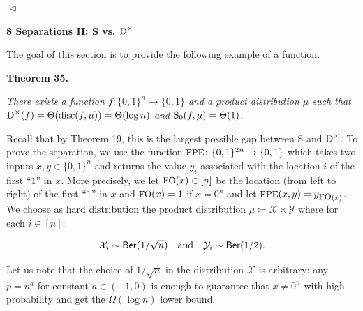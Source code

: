 \documentclass[10pt,a4paper]{article}
\begin{document}
$\vartriangleleft$\par






\par\medskip\noindent\textbf{
8 Separations II: S vs. ${\textup{D}}^{\times}$
}\par




The goal of this section is to provide the following example of a function.\par





\par\medskip\noindent\textbf{
\textbf{Theorem 35}\textbf{.}
}\par



\emph{There exists a function $f\colon\{0,1\}^{n}\to\{0,1\}$ and a product distribution $\mu$ such that ${\textup{D}}^{\times}(f)=\Theta({\textup{disc}}(f,\mu))=\Theta(\log n)$ and ${\textup{S}}_{0}(f,\mu)=\Theta(1)$.}\par






Recall that by Theorem 19, this is the largest possible gap between S and ${\textup{D}}^{\times}$. To prove the separation, we use the function ${\textrm{\small{FPE}}}\colon\{0,1\}^{2n}\to\{0,1\}$ which takes two inputs $x,y\in\{0,1\}^{n}$ and returns the value $y_{i}$ associated with the location $i$ of the first “$1$” in $x$. More precisely, we let ${\textrm{\small{FO}}}(x)\in[n]$ be the location (from left to right) of the first “$1$” in $x$ and ${\textrm{\small{FO}}}(x)=1$ if $x=0^{n}$ and let ${\textrm{\small{FPE}}}(x,y)=y_{{\textrm{\small{FO}}}(x)}$. We choose as hard distribution the product distribution $\mu\coloneqq\mathcal{X}\times\mathcal{Y}$ where for each $i\in[n]$:\par


\[\begin{gathered}
\mathcal{X}_{i}\sim\mathsf{Ber}(1/\sqrt{n})\quad\textup{and}\quad\mathcal{Y}_{i}\sim\mathsf{Ber}(1/2).
\end{gathered}\]


Let us note that the choice of $1/\sqrt{n}$ in the distribution $\mathcal{X}$ is arbitrary: any $p=n^{a}$ for constant $a\in(-1,0)$ is enough to guarantee that $x\neq 0^{n}$ with high probability and get the $\Omega(\log n)$ lower bound.\par
\end{document}
